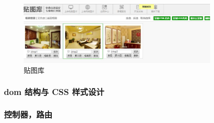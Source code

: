 \documentclass[UTF8]{ctexbook}
\begin{document}
        \begin{figure}[H]
          \centering
          \includegraphics[width=10cm]{./img/tietuku.jpg}
          \caption{贴图库}
          \label{fig:tietuku}
        \end{figure}

      \subsubsection{dom 结构与 CSS 样式设计}
        \label{subsubsec:dom_结构与_css_样式设计}



      \subsubsection{控制器，路由}
        \label{subsubsec:控制器_路由}
\end{document}
